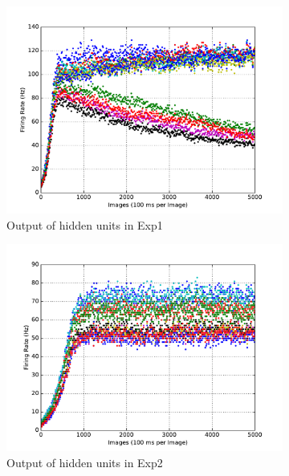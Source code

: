 \begin{figure}
\begin{subfigure}[t]{0.4\textwidth}
		\includegraphics[width=\textwidth]{pics_sdlm/13_exp_SRBM_noise_long/exp1_hid_s.pdf}
		\caption{Output of hidden units in Exp1}
	\end{subfigure}
	\begin{subfigure}[t]{0.4\textwidth}
		\includegraphics[width=\textwidth]{pics_sdlm/13_exp_SRBM_noise_long/exp2_hid_s.pdf}
		\caption{Output of hidden units in Exp2}
	\end{subfigure}\\
	\begin{subfigure}[t]{0.4\textwidth}

\end{subfigure}
\end{figure}
